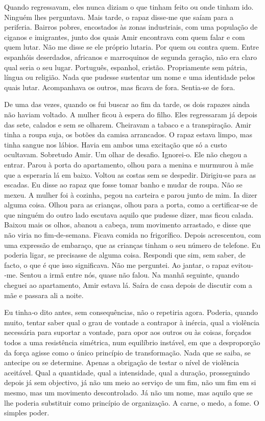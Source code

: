 Quando regressavam, eles nunca diziam o que tinham feito ou onde tinham
ido. Ninguém lhes perguntava. Mais tarde, o rapaz disse­‑me que saíam
para a periferia. Bairros pobres, encostados às zonas industriais, com
uma população de ciganos e imigrantes, junto dos quais Amir encontrava
com quem falar e com quem lutar. Não me disse se ele próprio lutaria.
Por quem ou contra quem. Entre espanhóis deserdados, africanos e
marroquinos de segunda geração, não era claro qual seria o seu lugar.
Português, espanhol, cristão. Propriamente sem pátria, língua ou
religião. Nada que pudesse sustentar um nome e uma identidade pelos
quais lutar. Acompanhava os outros, mas ficava de fora. Sentia­‑se de
fora.

De uma das vezes, quando os fui buscar ao fim da tarde, os dois rapazes
ainda não haviam voltado. A mulher ficou à espera do filho. Eles
regressaram já depois das sete, calados e sem se olharem. Cheiravam a
tabaco e a transpiração. Amir tinha a roupa suja, os botões da camisa
arrancados. O rapaz estava limpo, mas tinha sangue nos lábios. Havia em
ambos uma excitação que só a custo ocultavam. Sobretudo Amir. Um olhar
de desafio. Ignorei­‑o. Ele não chegou a entrar. Parou à porta do
apartamento, olhou para a menina e murmurou à mãe que a esperaria lá em
baixo. Voltou as costas sem se despedir. Dirigiu­‑se para as escadas. Eu
disse ao rapaz que fosse tomar banho e mudar de roupa. Não se mexeu. A
mulher foi à cozinha, pegou na carteira e parou junto de mim. Ia dizer
alguma coisa. Olhou para as crianças, olhou para a porta, como a
certificar­‑se de que ninguém do outro lado escutava aquilo que pudesse
dizer, mas ficou calada. Baixou mais os olhos, abanou a cabeça, num
movimento arrastado, e disse que não viria no fim­‑de­‑semana. Ficava
comida no frigorífico. Depois acrescentou, com uma expressão de
embaraço, que as crianças tinham o seu número de telefone. Eu poderia
ligar, se precisasse de alguma coisa. Respondi que sim, sem saber, de
facto, o que é que isso significava. Não me perguntei. Ao jantar, o
rapaz evitou­‑me. Sentou a irmã entre nós, quase não falou. Na manhã
seguinte, quando cheguei ao apartamento, Amir estava lá. Saíra de casa
depois de discutir com a mãe e passara ali a noite.

Eu tinha­‑o dito antes, sem consequências, não o repetiria agora.
Poderia, quando muito, tentar saber qual o grau de vontade a contrapor à
inércia, qual a violência necessária para suportar a vontade, para opor
aos outros ou às coisas, forçados todos a uma resistência simétrica, num
equilíbrio instável, em que a desproporção da força agisse como o único
princípio de transformação. Nada que se saiba, se antecipe ou se
determine. Apenas a obrigação de testar o nível de violência aceitável.
Qual a quantidade, qual a intensidade, qual a duração, prosseguindo
depois já sem objectivo, já não um meio ao serviço de um fim, não um fim
em si mesmo, mas um movimento descontrolado. Já não um nome, mas aquilo
que se lhe poderia substituir como princípio de organização. A carne, o
medo, a fome. O simples poder.

